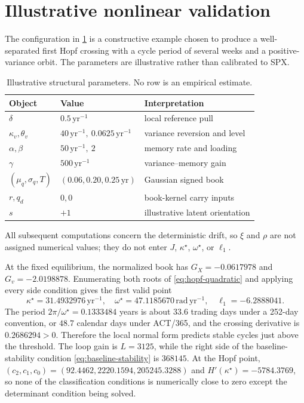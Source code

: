 \documentclass[11pt]{article}
\begin{document}
\section{Illustrative nonlinear validation}
\label{sec:numerical}

The configuration in \cref{tab:configuration} is a constructive example chosen to produce a
well-separated first Hopf crossing with a cycle period of several weeks and a positive-variance
orbit.  The parameters are illustrative rather than calibrated to SPX.

\begin{table}[!htbp]
\centering
\begin{tabular}{lll}
\toprule
Object & Value & Interpretation\\
\midrule
$\delta$ & $0.5\,\mathrm{yr}^{-1}$ & local reference pull\\
$\kappa_v,\theta_v$ & $40\,\mathrm{yr}^{-1},\ 0.0625\,\mathrm{yr}^{-1}$ & variance reversion and level\\
$\alpha,\beta$ & $50\,\mathrm{yr}^{-1},\ 2$ & memory rate and loading\\
$\gamma$ & $500\,\mathrm{yr}^{-1}$ & variance--memory gain\\
$(\mu_q,\sigma_q,T)$ & $(0.06,0.20,0.25\,\mathrm{yr})$ & Gaussian signed book\\
$r,q_d$ & $0,0$ & book-kernel carry inputs\\
$s$ & $+1$ & illustrative latent orientation\\
\bottomrule
\end{tabular}
\caption{Illustrative structural parameters.  No row is an empirical estimate.}
\label{tab:configuration}
\end{table}

All subsequent computations concern the deterministic drift, so $\xi$ and $\rho$ are not
assigned numerical values; they do not enter $J$, $\kappa^\star$, $\omega^\star$, or
$\ell_1$.

At the fixed equilibrium, the normalized book has
$G_X=-0.0617978$ and $G_v=-2.0198878$.  Enumerating both roots of
\eqref{eq:hopf-quadratic} and applying every side condition gives the first valid point
\begin{equation}
\kappa^\star=31.4932976\,\mathrm{yr}^{-1},\quad
\omega^\star=47.1185670\,\mathrm{rad}\,\mathrm{yr}^{-1},\quad
\ell_1=-6.2888041. \label{eq:canonical-values}
\end{equation}
The period $2\pi/\omega^\star=0.1333484$ years is about $33.6$ trading days under a
252-day convention, or $48.7$ calendar days under ACT/365,
and the crossing derivative is $0.2686294>0$.  Therefore the local normal form predicts
stable cycles just above the threshold.
The loop gain is $L=3125$, while the right side of the baseline-stability condition
\eqref{eq:baseline-stability} is $368145$.  At the Hopf point,
$(c_2,c_1,c_0)=(92.4462,2220.1594,205245.3288)$ and
$H'(\kappa^\star)=-5784.3769$, so none of the classification conditions is numerically
close to zero except the determinant condition being solved.
\end{document}
